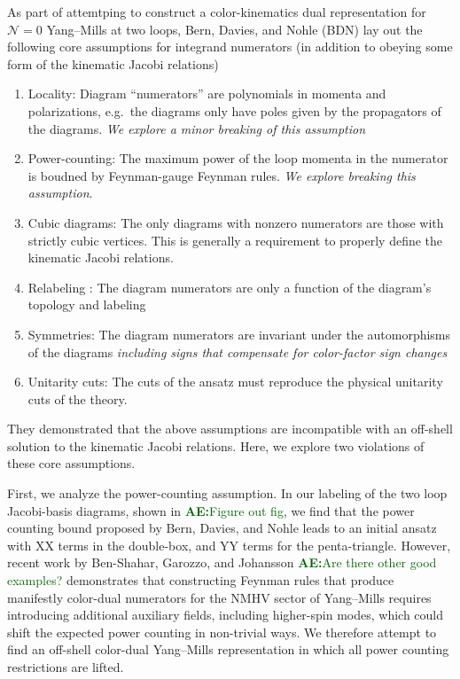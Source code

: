 \documentclass[11pt,letter]{article}
\newcommand{\ace}[1]{\textcolor{darkgreen}{\textbf{AE:}{#1}}}
\newcommand{\eg}{e.g.~}
\begin{document}
As part of attemtping to construct a color-kinematics dual
representation for $\mathcal{N}=0$ Yang--Mills at two loops, Bern,
Davies, and Nohle (BDN) lay out the following core assumptions for
integrand numerators (in addition to obeying some form of the
kinematic Jacobi relations) \cite{Bern:2015ooa}
\begin{enumerate}
\item Locality: Diagram ``numerators'' are polynomials in momenta and
  polarizations, \eg the diagrams only have poles given by the
  propagators of the diagrams. \emph{We explore a minor breaking of this assumption}
\item Power-counting: The maximum power of the loop momenta in the
  numerator is boudned by Feynman-gauge Feynman rules.  \emph{We
    explore breaking this assumption}.
\item Cubic diagrams: The only diagrams with nonzero numerators are
  those with strictly cubic vertices.  This is generally a requirement
  to properly define the kinematic Jacobi relations.
\item Relabeling : The diagram numerators are only a function of the
  diagram's topology and labeling
\item Symmetries: The diagram numerators are invariant under the
  automorphisms of the diagrams \emph{including signs that compensate
    for color-factor sign changes}
\item Unitarity cuts: The cuts of the ansatz must reproduce the
  physical unitarity cuts of the theory.
\end{enumerate}
They demonstrated that the above assumptions are incompatible with an
off-shell solution to the kinematic Jacobi relations.  Here, we
explore two violations of these core assumptions.

First, we analyze the power-counting assumption.  In our labeling of
the two loop Jacobi-basis diagrams, shown in \ace{Figure out fig}, we
find that the power counting bound proposed by Bern, Davies, and Nohle
leads to an initial ansatz with XX terms in the double-box, and YY
terms for the penta-triangle.  However, recent work by Ben-Shahar,
Garozzo, and Johansson \cite{Ben-Shahar:2022ixa} \ace{Are there other
  good examples?} demonstrates that constructing Feynman rules that
produce manifestly color-dual numerators for the NMHV sector of
Yang--Mills requires introducing additional auxiliary fields,
including higher-spin modes, which could shift the expected power
counting in non-trivial ways.  We therefore attempt to find an
off-shell color-dual Yang--Mills representation in which all power
counting restrictions are lifted.
\end{document}
